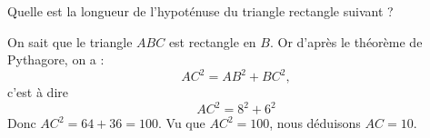 \begin{example}
    Quelle est la longueur de l'hypoténuse du triangle rectangle suivant ?
    \begin{center}
        
    \end{center}
    On sait que le triangle \( ABC\) est rectangle en \( B\). Or d'après le théorème de Pythagore, on a :
    \begin{equation}
        AC^2=AB^2+BC^2,
    \end{equation}
    c'est à dire
    \begin{equation}
        AC^2=8^2+6^2
    \end{equation}
    Donc \( AC^2=64+36=100\). Vu que \( AC^2=100\), nous déduisons \( AC=10\).
\end{example}

